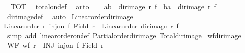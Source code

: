 \begin{isabellebody}
\ {}\ TOT\ \isamarkupfalse%
\ total{\isacharunderscore}{\kern0pt}on{\isacharunderscore}{\kern0pt}def\ \isamarkupfalse%
\ auto\isanewline
\ \ \isamarkupfalse%
\ {\isachardoublequoteopen}{\isacharparenleft}{\kern0pt}a{\isacharprime}{\kern0pt}{\isacharcomma}{\kern0pt}b{\isacharprime}{\kern0pt}{\isacharparenright}{\kern0pt}\ {\isasymin}\ dir{\isacharunderscore}{\kern0pt}image\ r\ f\ {\isasymor}\ {\isacharparenleft}{\kern0pt}b{\isacharprime}{\kern0pt}{\isacharcomma}{\kern0pt}a{\isacharprime}{\kern0pt}{\isacharparenright}{\kern0pt}\ {\isasymin}\ dir{\isacharunderscore}{\kern0pt}image\ r\ f{\isachardoublequoteclose}\isanewline
\ \ \isamarkupfalse%
\ {}\ \isamarkupfalse%
\ dir{\isacharunderscore}{\kern0pt}image{\isacharunderscore}{\kern0pt}def\ \isamarkupfalse%
\ auto\isanewline
{}\isamarkupfalse%
%
\endisatagproof
{\isafoldproof}%
%
\isadelimproof
\isanewline
%
\endisadelimproof
\isanewline
{}\isamarkupfalse%
\ Linear{\isacharunderscore}{\kern0pt}order{\isacharunderscore}{\kern0pt}dir{\isacharunderscore}{\kern0pt}image{\isacharcolon}{\kern0pt}\isanewline
{\isachardoublequoteopen}{\isasymlbrakk}Linear{\isacharunderscore}{\kern0pt}order\ r{\isacharsemicolon}{\kern0pt}\ inj{\isacharunderscore}{\kern0pt}on\ f\ {\isacharparenleft}{\kern0pt}Field\ r{\isacharparenright}{\kern0pt}{\isasymrbrakk}\ {\isasymLongrightarrow}\ Linear{\isacharunderscore}{\kern0pt}order\ {\isacharparenleft}{\kern0pt}dir{\isacharunderscore}{\kern0pt}image\ r\ f{\isacharparenright}{\kern0pt}{\isachardoublequoteclose}\isanewline
%
\isadelimproof
%
\endisadelimproof
%
\isatagproof
{}\isamarkupfalse%
\ {\isacharparenleft}{\kern0pt}simp\ add{\isacharcolon}{\kern0pt}\ linear{\isacharunderscore}{\kern0pt}order{\isacharunderscore}{\kern0pt}on{\isacharunderscore}{\kern0pt}def\ Partial{\isacharunderscore}{\kern0pt}order{\isacharunderscore}{\kern0pt}dir{\isacharunderscore}{\kern0pt}image\ Total{\isacharunderscore}{\kern0pt}dir{\isacharunderscore}{\kern0pt}image{\isacharparenright}{\kern0pt}%
\endisatagproof
{\isafoldproof}%
%
\isadelimproof
\isanewline
%
\endisadelimproof
\isanewline
{}\isamarkupfalse%
\ wf{\isacharunderscore}{\kern0pt}dir{\isacharunderscore}{\kern0pt}image{\isacharcolon}{\kern0pt}\isanewline
{}\ WF{\isacharcolon}{\kern0pt}\ {\isachardoublequoteopen}wf\ r{\isachardoublequoteclose}\ \ INJ{\isacharcolon}{\kern0pt}\ {\isachardoublequoteopen}inj{\isacharunderscore}{\kern0pt}on\ f\ {\isacharparenleft}{\kern0pt}Field\ r{\isacharparenright}{\kern0pt}{\isachardoublequoteclose}\isanewline

\end{isabellebody}
